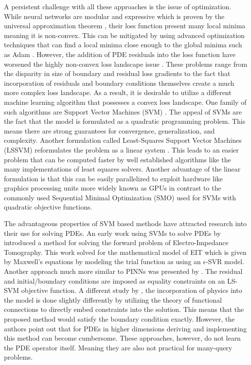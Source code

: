 A persistent challenge with all these approaches is the issue of optimization. While neural networks are modular and expressive which is proven by the universal approximation theorem \autocite{cybenkoApproximationSuperpositionsSigmoidal1989,hornikMultilayerFeedforwardNetworks1989}, their loss function present many local minima meaning it is non-convex. This can be mitigated by using advanced optimization techniques that can find a local minima close enough to the global minima such as Adam \autocite{shresthaReviewDeepLearning2019,soydanerComparisonOptimizationAlgorithms2020}. However, the addition of PDE residuals into the loss function have worsened the highly non-convex loss landscape issue \autocite{rathoreChallengesTrainingPINNs2024,NEURIPS2021_df438e52,basirCriticalInvestigationFailure2022}. These problems range from the disparity in size of boundary and residual loss gradients to the fact that incorporation of residuals and boundary conditions themselves create a much more complex loss landscape. As a result, it is desirable to utilize a different machine learning algorithm that possesses a convex loss landscape. One family of such algorithms are Support Vector Machines (SVM) \autocite{vapnikNatureStatisticalLearning2000}. The appeal of SVMs are the fact that the model is formulated as a quadratic programming problem. This means there are strong guarantees for convergence, generalization, and complexity. Another formulation called Least-Squares Support Vector Machines (LSSVM) reformulates the problem as a linear system \autocite{suykensLeastSquaresSupport2005}. This leads to an easier problem that can be computed faster by well established algorithms like the many implementations of least squares solvers. Another advantage of the linear formulation is that this can be easily parallelized to exploit hardware like graphics processing units more widely known as GPUs in contrast to the commonly used Sequential Minimal Optimization (SMO) used for SVMs with quadratic objective functions.

The advantageous properties of SVM based methods have attracted research into their use for solving PDEs. An early work using SVMs to solve PDEs by \textcite{youxiwuSVMSolvingForward2005} introduced a method for solving the forward problem of Electro-Impedance Tomography. This work solved for the mathematical model of EIT which is given by Maxwell's equations by modeling the trial function as using an \(\epsilon \)-SVR model. Another approach much more similar to PINNs was presented by \textcite{mehrkanoonLearningSolutionsPartial2015}. The residual and initial/boundary conditions are imposed as equality constraints on an LS-SVM objective function. A different study by \textcite{leakeAnalyticallyEmbeddingDifferential2019}, the incorporation of physics into the model is done slightly differently by utilizing the theory of functional connections to directly embed constraints into the solution. This means that the proposed method would satisfy the boundary condition exactly. However, the authors point out that for PDEs in higher dimensions deriving and implementing this method can become cumbersome. These approaches, however, do not learn the PDE operator itself. Meaning they are also not practical for many-query problems.

